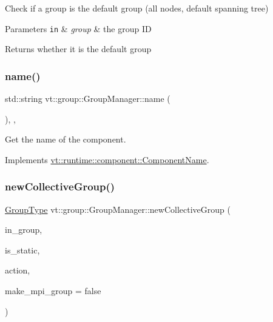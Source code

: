 Check if a group is the default group (all nodes, default spanning tree) 


\begin{DoxyParams}[1]{Parameters}
\mbox{\tt in}  & {\em group} & the group ID\\
\hline
\end{DoxyParams}
\begin{DoxyReturn}{Returns}
whether it is the default group 
\end{DoxyReturn}
\mbox{\label{structvt_1_1group_1_1_group_manager_a46802e85936e68f9bebc844af1793da3}} 
\subsubsection{\texorpdfstring{name()}{name()}}
{\footnotesize\ttfamily std\+::string vt\+::group\+::\+Group\+Manager\+::name (\begin{DoxyParamCaption}{ }\end{DoxyParamCaption})\hspace{0.3cm}{\ttfamily [inline]}, {\ttfamily [override]}, {\ttfamily [virtual]}}



Get the name of the component. 



Implements \hyperlink{structvt_1_1runtime_1_1component_1_1_component_name_a33c06229bb605a2b2ceff68830d6d773}{vt\+::runtime\+::component\+::\+Component\+Name}.

\mbox{\label{structvt_1_1group_1_1_group_manager_aeea7806669858363e19dfd221fee9cf5}} 
\subsubsection{\texorpdfstring{new\+Collective\+Group()}{newCollectiveGroup()}}
{\footnotesize\ttfamily \hyperlink{namespacevt_a27b5e4411c9b6140c49100e050e2f743}{Group\+Type} vt\+::group\+::\+Group\+Manager\+::new\+Collective\+Group (\begin{DoxyParamCaption}\item[{bool const}]{in\+\_\+group,  }\item[{bool const}]{is\+\_\+static,  }\item[{\hyperlink{structvt_1_1group_1_1_group_manager_ae871c5871ad62b530220009c1ee4d4b9}{Action\+Group\+Type}}]{action,  }\item[{bool}]{make\+\_\+mpi\+\_\+group = {\ttfamily false} }\end{DoxyParamCaption})\hspace{0.3cm}{\ttfamily [private]}}



